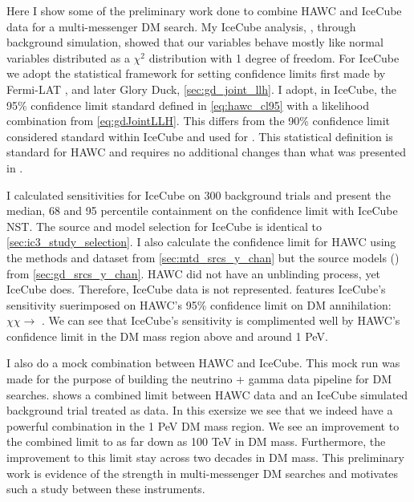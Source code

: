 Here I show some of the preliminary work done to combine HAWC and IceCube data for a multi-messenger DM search.
My IceCube analysis, , through background simulation, showed that our variables behave mostly like normal variables distributed as a $\chi^2$ distribution with 1 degree of freedom.
For IceCube we adopt the statistical framework for setting confidence limits first made by Fermi-LAT \cite{FermiLAT:dm1}, and later Glory Duck, \cref{sec:gd_joint_llh}.
I adopt, in IceCube, the 95\% confidence limit standard defined in \cref{eq:hawc_cl95} with a likelihood combination from \cref{eq:gdJointLLH}.
This differs from the 90\% confidence limit considered standard within IceCube and used for .
This statistical definition is standard for HAWC and requires no additional changes than what was presented in .

I calculated sensitivities for IceCube on 300 background trials and present the median, 68 and 95 percentile containment on the confidence limit with IceCube NST.
The source and model selection for IceCube is identical to \cref{sec:ic3_study_selection}.
I also calculate the confidence limit for HAWC using the methods and dataset from \cref{sec:mtd_srcs_y_chan} but the source models (\GS) from \cref{sec:gd_srcs_y_chan}.
HAWC did not have an unblinding process, yet IceCube does.
Therefore, IceCube data is not represented.
 features IceCube's sensitivity suerimposed on HAWC's 95\% confidence limit on DM annihilation: $\chi\chi \rightarrow$ \parpar{\nu_\mu}.
We can see that IceCube's sensitivity is complimented well by HAWC's confidence limit in the DM mass region above and around 1 PeV.

I also do a mock combination between HAWC and IceCube.
This mock run was made for the purpose of building the neutrino + gamma data pipeline for DM searches.
 shows a combined limit between HAWC data and an IceCube simulated background trial treated as data.
In this exersize we see that we indeed have a powerful combination in the 1 PeV DM mass region.
We see an improvement to the combined limit to as far down as 100 TeV in DM mass.
Furthermore, the improvement to this limit stay across two decades in DM mass.
This preliminary work is evidence of the strength in multi-messenger DM searches and motivates such a study between these instruments.

